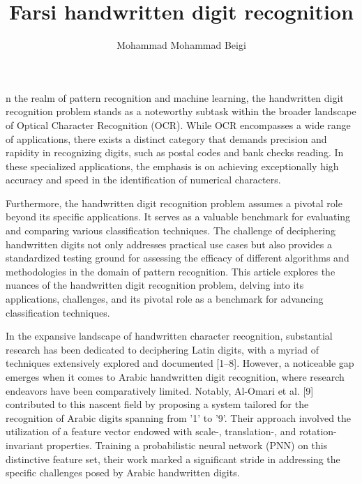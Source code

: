 \documentclass[9pt,twocolumn]{paper-template}
\title{Farsi handwritten digit recognition}
\author[a]{Mohammad Mohammad Beigi}
\affil[a]{Student, Department, Sharif University of Technology}
\begin{document}
\maketitle
\thispagestyle{firststyle}




n the realm of pattern recognition and machine learning, the handwritten digit recognition problem stands as a noteworthy subtask within the broader landscape of Optical Character Recognition (OCR). While OCR encompasses a wide range of applications, there exists a distinct category that demands precision and rapidity in recognizing digits, such as postal codes and bank checks reading. In these specialized applications, the emphasis is on achieving exceptionally high accuracy and speed in the identification of numerical characters.

Furthermore, the handwritten digit recognition problem assumes a pivotal role beyond its specific applications. It serves as a valuable benchmark for evaluating and comparing various classification techniques. The challenge of deciphering handwritten digits not only addresses practical use cases but also provides a standardized testing ground for assessing the efficacy of different algorithms and methodologies in the domain of pattern recognition. This article explores the nuances of the handwritten digit recognition problem, delving into its applications, challenges, and its pivotal role as a benchmark for advancing classification techniques.


In the expansive landscape of handwritten character recognition, substantial research has been dedicated to deciphering Latin digits, with a myriad of techniques extensively explored and documented [1–8]. However, a noticeable gap emerges when it comes to Arabic handwritten digit recognition, where research endeavors have been comparatively limited. Notably, Al-Omari et al. [9] contributed to this nascent field by proposing a system tailored for the recognition of Arabic digits spanning from '1' to '9'. Their approach involved the utilization of a feature vector endowed with scale-, translation-, and rotation-invariant properties. Training a probabilistic neural network (PNN) on this distinctive feature set, their work marked a significant stride in addressing the specific challenges posed by Arabic handwritten digits.
\end{document}

